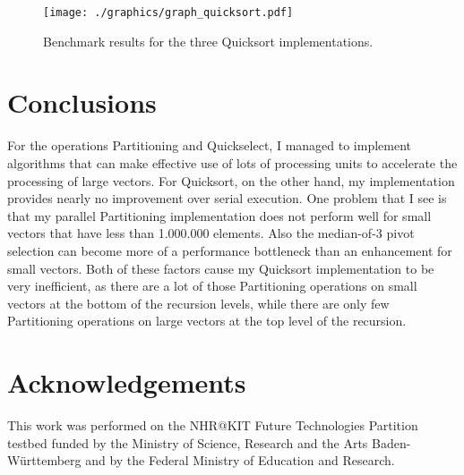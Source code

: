 \documentclass[sigconf]{acmart}
\begin{document}
\begin{figure}[h]
  \centering
  \texttt{[image: ./graphics/graph\_quicksort.pdf]}
  \caption{Benchmark results for the three Quicksort implementations.} 
  \label{fig:benchmark:quicksort}
\end{figure}

\section{Conclusions}

For the operations Partitioning and Quickselect, I managed to implement algorithms that can make effective use of lots of processing units to accelerate the processing of large vectors. For Quicksort, on the other hand, my implementation provides nearly no improvement over serial execution. One problem that I see is that my parallel Partitioning implementation does not perform well for small vectors that have less than 1.000.000 elements. Also the median-of-3 pivot selection can become more of a performance bottleneck than an enhancement for small vectors. Both of these factors cause my Quicksort implementation to be very inefficient, as there are a lot of those Partitioning operations on small vectors at the bottom of the recursion levels, while there are only few Partitioning operations on large vectors at the top level of the recursion.

\section*{Acknowledgements}

This work was performed on the NHR@KIT Future Technologies Partition testbed funded by the Ministry of Science, Research and the Arts Baden-Württemberg and by the Federal Ministry of Education and Research.



\end{document}
